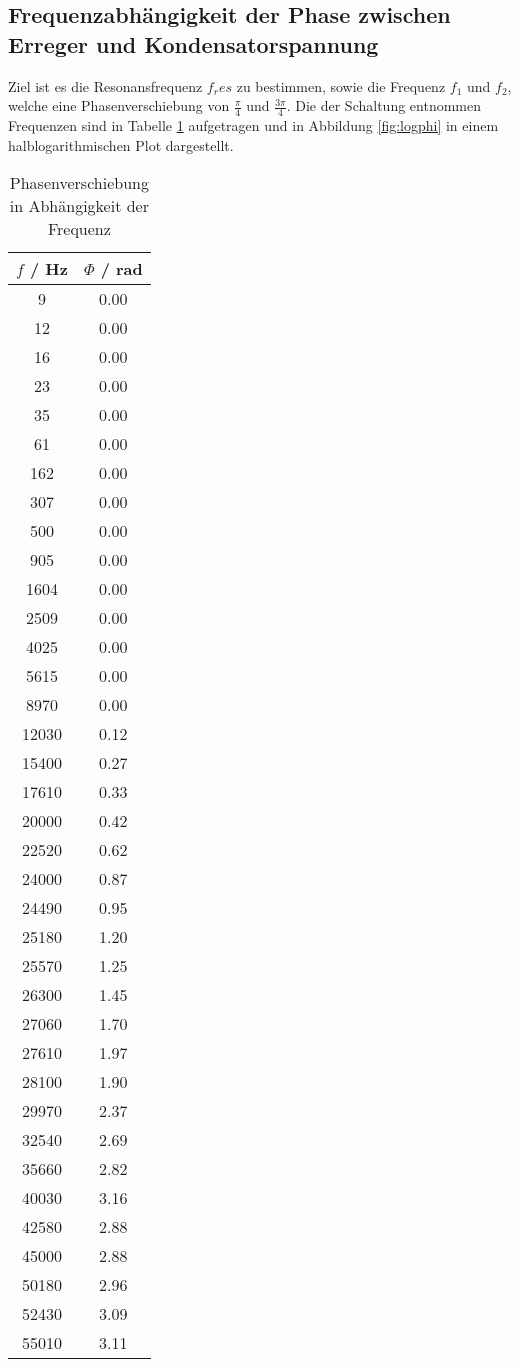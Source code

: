 \subsection{Frequenzabhängigkeit der Phase zwischen Erreger und Kondensatorspannung}
Ziel ist es die Resonansfrequenz $f_res$ zu bestimmen, sowie die Frequenz $f_1$ und $f_2$, welche eine Phasenverschiebung von $\frac{\pi}{4}$ und $\frac{3 \pi}{4}$. Die der Schaltung entnommen Frequenzen sind in Tabelle \ref{tab:phi} aufgetragen und in Abbildung \ref{fig:logphi} in einem halblogarithmischen Plot dargestellt.
\begin{table}
  \centering
  \begin{tabular}{c c}
	\toprule
	$f$ / Hz & $\Phi$ / rad \\
	\midrule
	9   & 0.00 \\
	12  & 0.00 \\
	16  & 0.00 \\
	23  & 0.00 \\
	35  & 0.00 \\
	61  & 0.00 \\
	162 & 0.00 \\
	307 & 0.00 \\
	500 & 0.00 \\
	905 & 0.00 \\
	1604 & 0.00 \\
	2509 & 0.00 \\
	4025 & 0.00 \\
	5615 & 0.00 \\
	8970 & 0.00 \\
	12030 & 0.12 \\
	15400 & 0.27 \\
	17610 & 0.33 \\
	20000 & 0.42 \\
	22520 & 0.62 \\
	24000 & 0.87 \\
	24490 & 0.95 \\
	25180 & 1.20 \\
	25570 & 1.25 \\
	26300 & 1.45 \\
	27060 & 1.70 \\
	27610 & 1.97 \\
	28100 & 1.90 \\
	29970 & 2.37 \\
	32540 & 2.69 \\
	35660 & 2.82 \\
	40030 & 3.16 \\
	42580 & 2.88 \\
	45000 & 2.88 \\
	50180 & 2.96 \\
	52430 & 3.09 \\
	55010 & 3.11 \\
  \end{tabular}
  \caption{Phasenverschiebung in Abhängigkeit der Frequenz}
  \label{tab:phi}
\end{table}
